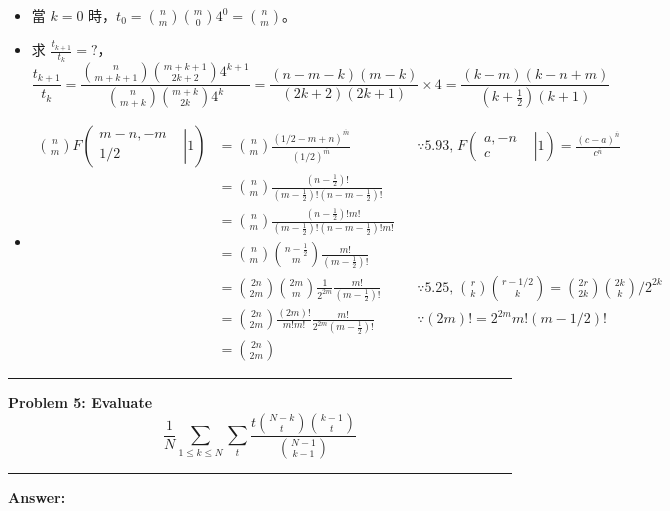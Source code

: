 \documentclass[11pt]{article}
\newcommand\question[2]{\vspace{.25in}\hrule\textbf{#1: #2}\vspace{.5em}\hrule\vspace{.10in}}
\renewcommand\part[1]{\vspace{.10in}\textbf{#1}}
\begin{document}
\begin{itemize}
	\item 當 $k = 0$ 時，$t_0 = \binom{n}{m} \binom{m}{0} 4^0 = \binom{n}{m}$。
	\item 求 $\frac{t_{k+1}}{t_k} = ?$，
	$$\frac{t_{k+1}}{t_k} = \frac{\binom{n}{m+k+1}\binom{m+k+1}{2k+2} 4^{k+1}}{\binom{n}{m+k}\binom{m+k}{2k} 4^k} = \frac{(n-m-k)(m-k)}{(2k+2)(2k+1)} \times 4 = \frac{(k-m)(k-n+m)}{(k+\frac{1}{2})(k+1)}$$
	\item 
		\begin{align*}
		\binom{n}{m} F \left (\left.\begin{matrix}
m-n, -m & \\ 
 1/2 & 
\end{matrix}\right|1 \right) &= \binom{n}{m} \frac{(1/2-m+n)^{\overline{m}}}{(1/2)^{\overline{m}}} 
			&& \because \text{5.93,} \; F \left (\left.\begin{matrix}
a, -n & \\ 
 c & 
\end{matrix}\right|1 \right) = \frac{(c-a)^{\overline{n}}}{c^{\overline{n}}}\\
			&= \binom{n}{m} \frac{(n-\frac{1}{2})!}{(m-\frac{1}{2})!(n-m-\frac{1}{2})!} \\
			&= \binom{n}{m} \frac{(n-\frac{1}{2})!m!}{(m-\frac{1}{2})!(n-m-\frac{1}{2})!m!} \\
			&= \binom{n}{m} \binom{n-\frac{1}{2}}{m} \frac{m!}{(m-\frac{1}{2})!} \\
			&= \binom{2n}{2m} \binom{2m}{m} \frac{1}{2^{2m}} \frac{m!}{(m-\frac{1}{2})!} 
				&& \because \text{5.25,} \; \binom{r}{k} \binom{r-1/2}{k} = \binom{2r}{2k} \binom{2k}{k}/2^{2k} \\
			&= \binom{2n}{2m} \frac{(2m)!}{m!m!} \frac{m!}{2^{2m} (m-\frac{1}{2})!} 
				&& \because (2m)! = 2^{2m} m! (m-1/2)!\\
			&= \binom{2n}{2m}
		\end{align*}
\end{itemize}

\question{Problem 5} {Evaluate $$\frac{1}{N} \sum_{1 \le k \le N} \sum_{t} \frac{t \binom{N-k}{t} \binom{k-1}{t}}{\binom{N-1}{k-1}}$$}

\part{Answer:}
\end{document}

